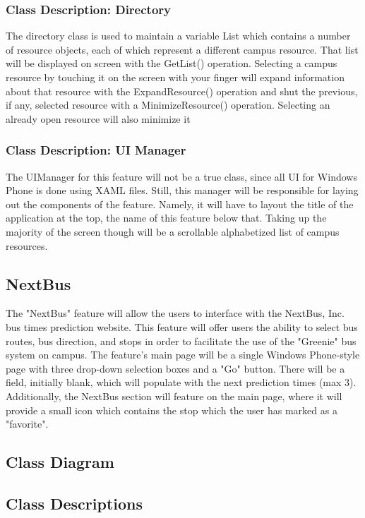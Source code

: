 \documentclass[pdftex,12pt,letter]{article}
\begin{document}
\subsubsection{Class Description: Directory}
The directory class is used to maintain a variable List which contains a number of resource objects, each of which represent a different campus resource. That list will be displayed on screen with the GetList() operation. Selecting a campus resource by touching it on the screen with your finger will expand information about that resource with the ExpandResource() operation and shut the previous, if any, selected resource with a MinimizeResource() operation. Selecting an already open resource will also minimize it 
\subsubsection{Class Description: UI Manager}
The UIManager for this feature will not be a true class, since all UI for Windows Phone is done using XAML files. Still, this manager will be responsible for laying out the components of the feature. Namely, it will have to layout the title of the application at the top, the name of this feature below that. Taking up the majority of the screen though will be a scrollable alphabetized list of campus resources. 


\subsection{NextBus}
The "NextBus" feature will allow the users to interface with the NextBus, Inc. bus times prediction website. This feature will offer users the ability to select bus routes, bus direction, and stops in order to facilitate the use of the "Greenie" bus system on campus. The feature's main page will be a single Windows Phone-style page with three drop-down selection boxes and a "Go" button. There will be a field, initially blank, which will populate with the next prediction times (max 3). Additionally, the NextBus section will feature on the main page, where it will provide a small icon which contains the stop which the user has marked as a "favorite".
\subsection{Class Diagram}
\subsection{Class Descriptions}
\end{document}
